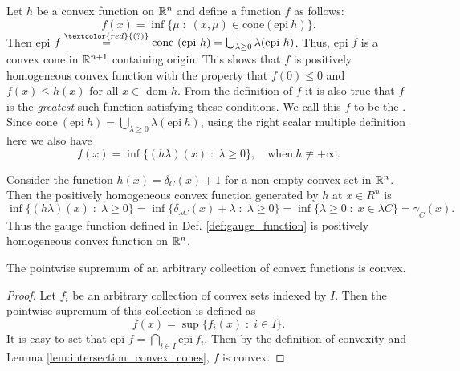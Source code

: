 \documentclass[11pt,a4paper]{article}
\begin{document}
\begin{remark}
    Let $h$ be a convex function on $\mathbb{R}^n$ and define a function $f$ as follows:
    \begin{equation*}
        f(x) = \inf \{\mu\;:\;(x,\mu)\in \text{cone}(\text{epi}\ h)\}.
    \end{equation*}
    Then epi $f \overset{\textcolor{red}{(?)}}{=} \text{cone}\ (\text{epi}\ h) = \bigcup_{\lambda\ge 0} \lambda (\text{epi}\ h)$. Thus, epi $f$ is a convex cone in $\mathbb{R}^{n+1}$ containing origin. This shows that $f$ is positively homogeneous convex function with the property that $f(0)\le 0$ and $f(x)\le h(x)$ for all $x\in$ dom $h$. From the definition of $f$ it is also true that $f$ is the \textit{greatest} such function satisfying these conditions. We call this $f$ to be the . Since $\text{cone}\ (\text{epi}\ h) = \bigcup_{\lambda\ge 0} \lambda (\text{epi}\ h)$, using the right scalar multiple definition here we also have
    \begin{equation*}
        f(x) = \inf\{(h\lambda)(x)\;:\;\lambda\ge 0\},\quad\text{when}\ h\not\equiv +\infty.
    \end{equation*}

    \noindent Consider the function $h(x) = \delta_C(x)+1$ for a non-empty convex set in $\mathbb{R}^n$. Then the positively homogeneous convex function generated by $h$ at $x\in R^n$ is 
    \begin{equation*}
        \inf\{(h\lambda)(x)\;:\;\lambda\ge 0\} = \inf \{\delta_{\lambda C}(x)+\lambda\;:\; \lambda\ge 0\} = \inf\{\lambda\ge 0\;:\; x\in \lambda C\} = \gamma_C(x).
    \end{equation*}
    Thus the gauge function defined in Def. \ref{def:gauge_function} is positively homogeneous convex function on $\mathbb{R}^n$.
\end{remark}

\begin{theorem}\label{thm:pointwise_sup}
    The pointwise supremum of an arbitrary collection of convex functions is convex.
\end{theorem}

\begin{proof}
    Let $f_i$ be an arbitrary collection of convex sets indexed by $I$. Then the pointwise supremum of this collection is defined as
    \begin{equation*}
        f(x) = \sup \{f_i(x)\;:\; i\in I\}.
    \end{equation*}
    It is easy to set that epi $f = \bigcap_{i\in I} \text{epi}\ f_i$. Then by the definition of convexity and Lemma \ref{lem:intersection_convex_cones}, $f$ is convex.
\end{proof}
\end{document}
